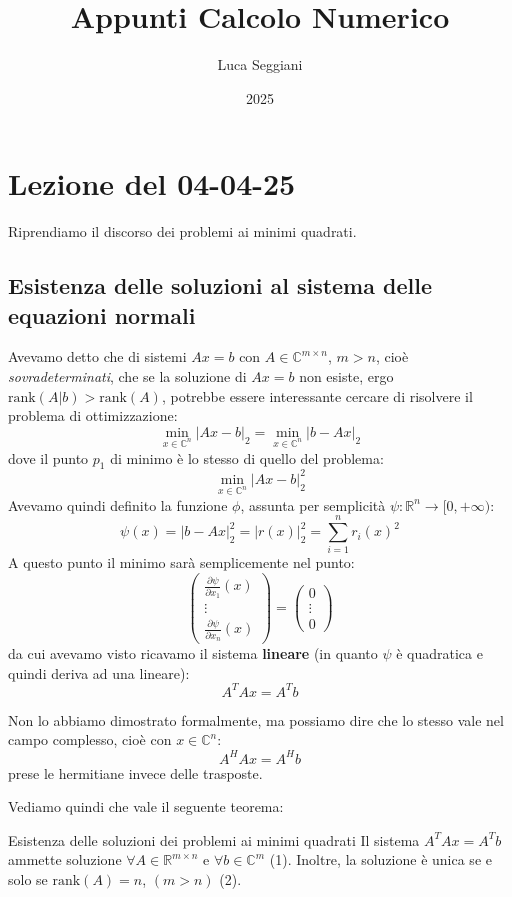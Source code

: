 \documentclass[a4paper,11pt]{article}
\title{Appunti Calcolo Numerico}
\author{Luca Seggiani}
\date{2025}
\begin{document}
\section{Lezione del 04-04-25}

\thispagestyle{empty}
\pagestyle{fancy}

Riprendiamo il discorso dei problemi ai minimi quadrati.

\subsection{Esistenza delle soluzioni al sistema delle equazioni normali}
Avevamo detto che di sistemi $Ax = b$ con $A \in \mathbb{C}^{m \times n}$, $m > n$, cioè \textit{sovradeterminati}, che se la soluzione di $Ax = b$ non esiste, ergo $\mathrm{rank}(A|b) > \mathrm{rank}(A)$, potrebbe essere interessante cercare di risolvere il problema di ottimizzazione:
$$
\min_{x \in \mathbb{C}^n} |Ax - b|_2 = \min_{x \in \mathbb{C}^n} |b - Ax|_2
$$
dove il punto $p_1$ di minimo è lo stesso di quello del problema:
$$
\min_{x \in \mathbb{C}^n} |Ax - b|_2^2
$$
Avevamo quindi definito la funzione $\phi$, assunta per semplicità $\psi:\mathbb{R}^n \rightarrow [0, +\infty)$:
$$
\psi(x) = |b - Ax|_2^2 = |r(x)|_2^2 = \sum_{i = 1}^n r_i(x)^2
$$
A questo punto il minimo sarà semplicemente nel punto:
$$
\begin{pmatrix}
	\frac{\partial \psi}{\partial x_1}(x) \\
	\vdots \\
	\frac{\partial \psi}{\partial x_n}(x)
\end{pmatrix}
=
\begin{pmatrix}
	0 \\ 
	\vdots \\
	0
\end{pmatrix}
$$
da cui avevamo visto ricavamo il sistema \textbf{lineare} (in quanto $\psi$ è quadratica e quindi deriva ad una lineare):
$$
A^T A x = A^T b
$$

Non lo abbiamo dimostrato formalmente, ma possiamo dire che lo stesso vale nel campo complesso, cioè con $x \in \mathbb{C}^n$:
$$
A^H A x = A^H b
$$
prese le hermitiane invece delle trasposte.

Vediamo quindi che vale il seguente teorema:
\begin{theorem}{Esistenza delle soluzioni dei problemi ai minimi quadrati}
	Il sistema $A^T A x = A^T b$ ammette soluzione $\forall A \in \mathbb{R}^{m \times n}$ e $\forall b \in \mathbb{C}^m$ (1).
	Inoltre, la soluzione è unica se e solo se $\mathrm{rank}(A) = n$, $(m > n)$ (2).
\end{theorem}
\end{document}
